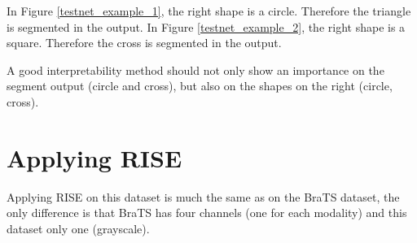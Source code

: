 In Figure \ref{testnet_example_1}, the right shape is a circle. Therefore the triangle is segmented in the output.
In Figure \ref{testnet_example_2}, the right shape is a square. Therefore the cross is segmented in the output.

A good interpretability method should not only show an importance on the segment output (circle and cross), but also on the shapes on the right (circle, cross).

\section{Applying RISE}

Applying RISE on this dataset is much the same as on the BraTS dataset, the only difference is that BraTS has four channels (one for each modality) and this dataset only one (grayscale).

